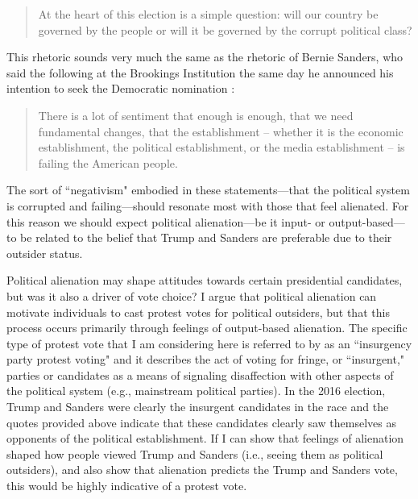 \documentclass[12pt]{article}
\begin{document}
\begin{quote}
	At the heart of this election is a simple question: will our country be governed by the people or will it be governed by the corrupt political class?
\end{quote}

\noindent This rhetoric sounds very much the same as the rhetoric of Bernie Sanders, who said the following at the Brookings Institution the same day he announced his intention to seek the Democratic nomination \parencite{Dews2015}:

\begin{quote}
	There is a lot of sentiment that enough is enough, that we need fundamental changes, that the establishment -- whether it is the economic establishment, the political establishment, or the media establishment -- is failing the American people.
\end{quote}

\noindent The sort of ``negativism" embodied in these statements---that the political system is corrupted and failing---should resonate most with those that feel alienated. For this reason we should expect political alienation---be it input- or output-based---to be related to the belief that Trump and Sanders are preferable due to their outsider status. 

Political alienation may shape attitudes towards certain presidential candidates, but was it also a driver of vote choice? I argue that political alienation can motivate individuals to cast protest votes for political outsiders, but that this process occurs primarily through feelings of output-based alienation. The specific type of protest vote that I am considering here is referred to by \textcite{alvarez2018taxonomy} as an ``insurgency party protest voting" and it describes the act of voting for fringe, or ``insurgent," parties or candidates as a means of signaling disaffection with other aspects of the political system (e.g., mainstream political parties). In the 2016 election, Trump and Sanders were clearly the insurgent candidates in the race and the quotes provided above indicate that these candidates clearly saw themselves as opponents of the political establishment. If I can show that feelings of alienation shaped how people viewed Trump and Sanders (i.e., seeing them as political outsiders), and also show that alienation predicts the Trump and Sanders vote, this would be highly indicative of a protest vote. 
\end{document}
